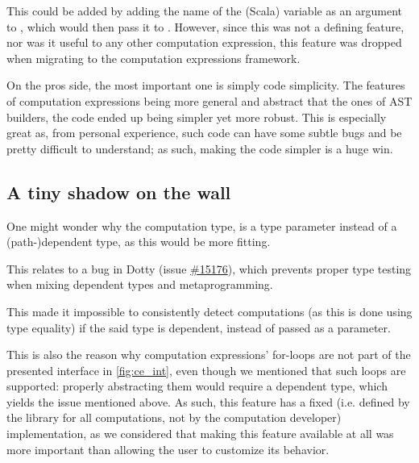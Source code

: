 This could be added by adding the name of the (Scala) variable as an argument to , which would then pass it to . However, since this was not a defining feature, nor was it useful to any other computation expression,
this feature was dropped when migrating to the computation expressions framework.

On the pros side, 
the most important one is simply code simplicity.
The features of computation expressions being more general and abstract that the ones of AST builders,
the code ended up being simpler yet more robust.
This is especially great as, from personal experience,
such code can have some subtle bugs and be pretty difficult to understand; as such, making the code simpler is a huge win.

\subsection{A tiny shadow on the wall}
One might wonder why the computation type,  is a type parameter instead of a (path-)dependent type,
as this would be more fitting.

This relates to a bug in Dotty (issue \href{https://github.com/lampepfl/dotty/issues/15176}{\#15176}), 
which prevents proper type testing when mixing dependent types and metaprogramming.

This made it impossible to consistently detect computations (as this is done using type equality) if the said type is dependent, instead of passed as a parameter.

This is also the reason why computation expressions' for-loops are not part of the presented interface in \cref{fig:ce_int},
even though we mentioned that such loops are supported:
properly abstracting them would require a dependent type,
which yields the issue mentioned above. 
As such, this feature has a fixed (i.e. defined by the library for all computations, not by the computation developer) implementation,
as we considered that making this feature available at all was more important than allowing the user to customize its behavior.